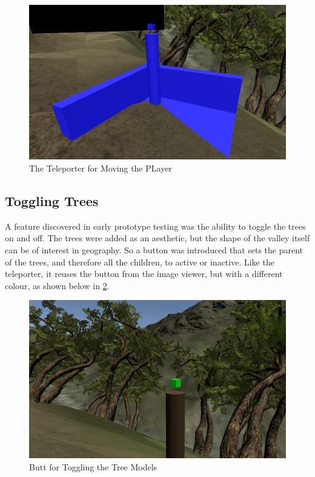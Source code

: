         \FloatBarrier
        \begin{figure}
            \centering
            \includegraphics[width=\ImageWidth]{figures/teleporter.PNG}
            \caption{The Teleporter for Moving the PLayer}
            \label{fig:teleporter}
        \end{figure}
        \FloatBarrier
    
    \subsection{Toggling Trees}
        A feature discovered in early prototype testing was the ability to toggle the trees on and off. The trees were added as an aesthetic, but the shape of the valley itself can be of interest in geography. So a button was introduced that sets the parent of the trees, and therefore all the children, to active or inactive. Like the teleporter, it reuses the button from the image viewer, but with a different colour, as shown below in \cref{fig:toggle_tree}.
        
        \FloatBarrier
        \begin{figure}
            \centering
            \includegraphics[width=\ImageWidth]{figures/toggel_trees.PNG}
            \caption{Butt for Toggling the Tree Models}
            \label{fig:toggle_tree}
        \end{figure}
        \FloatBarrier
    
